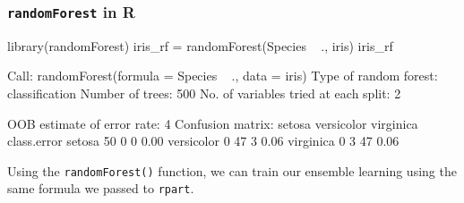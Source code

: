 \documentclass[a4paper]{article}
\begin{document}
\subsubsection{\lstinline|randomForest| in R}
\begin{Schunk}
\begin{Sinput}
library(randomForest)
iris_rf = randomForest(Species ~ ., iris)
iris_rf
\end{Sinput}
\begin{Soutput}

Call:
 randomForest(formula = Species ~ ., data = iris) 
               Type of random forest: classification
                     Number of trees: 500
No. of variables tried at each split: 2

        OOB estimate of  error rate: 4%
Confusion matrix:
           setosa versicolor virginica class.error
setosa         50          0         0        0.00
versicolor      0         47         3        0.06
virginica       0          3        47        0.06
\end{Soutput}
\end{Schunk}
Using the \lstinline|randomForest()| function, we can train our ensemble learning using the same formula we passed to \lstinline|rpart|.
\end{document}
